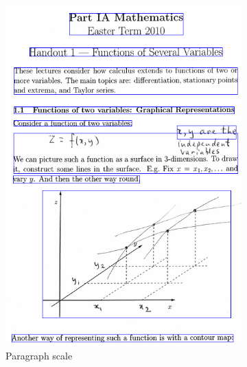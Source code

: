\begin{figure}[!htb]
\begin{subfigure}{.45\textwidth}
    \includegraphics[width=\textwidth]{pla-par.png}
    \caption{Paragraph scale}
  \end{subfigure}%
  \qquad
  \begin{subfigure}{.45\textwidth}

\end{subfigure}
\end{figure}

